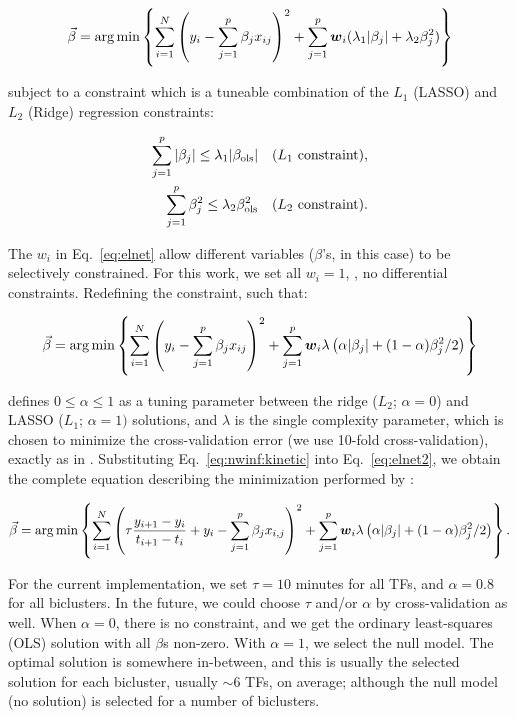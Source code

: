\begin{equation}
\label{eq:elnet}
 \vec{\beta} = \arg \min \left\{ \sum^N_{i = 1} \left( y_i - \sum^p_{j = 1} \beta_j x_{ij} \right)^2 + \sum_{j = 1}^p
   \boldsymbol{w}_i ( \lambda_1 | \beta_j | + \lambda_2 \beta^2_j) \right\}
\end{equation}

\noindent subject to a constraint which is a tuneable combination of the $L_1$
(LASSO) and $L_2$ (Ridge) regression constraints:

\vspace{-0.4in}

\begin{eqnarray*}
\label{eq:elnet:constraint}
\sum_{j = 1}^p | \beta_j | \leq \lambda_1 | \beta_{\operatorname{ols}} | & & \mathrm{(}L_1\ \mathrm{constraint)}, \\
\sum_{j = 1}^p \beta^2_j \leq \lambda_2 \beta^2_{\operatorname{ols}}     & & \mathrm{(}L_2\ \mathrm{constraint)}.
\end{eqnarray*}

\noindent 
The $w_i$ in Eq.~\ref{eq:elnet} allow different variables ($\beta$'s,
in this case) to be selectively constrained. For this work, we set all
$w_i=1$, \ie, no differential constraints. Redefining the constraint, such that:

\begin{equation}
\label{eq:elnet2}
 \vec{\beta} = \arg \min \left\{ \sum^N_{i = 1} \left( y_i - \sum^p_{j = 1} \beta_j x_{ij} \right)^2 + \sum_{j = 1}^p
   \boldsymbol{w}_i \lambda \left( \alpha | \beta_j | + (1-\alpha) \beta^2_j /2\right) \right\}
\end{equation}

\noindent defines $0\leq \alpha \leq 1$ as a tuning parameter between the ridge
($L_2$; $\alpha=0$) and LASSO ($L_1$; $\alpha=1)$ solutions, and
$\lambda$ is the single complexity parameter, which is chosen to
minimize the cross-validation error (we use 10-fold cross-validation),
exactly as in \cite{Bonneau2006}. Substituting
Eq.~\ref{eq:nwinf:kinetic} into Eq.~\ref{eq:elnet2}, we obtain the complete
equation describing the minimization performed by \nwinf:

\begin{equation}
\label{eq:elnet3}
 \vec{\beta} = \arg \min \left\{ \sum^N_{i = 1} 
 \left( \tau\frac{y_{i+1}-y_{i}}{t_{i+1}-t_i} + y_{i}- \sum_{j=1}^{p} \beta_j x_{i,j} \right)^2 + \sum_{j = 1}^p
   \boldsymbol{w}_i \lambda \left( \alpha | \beta_j | + (1-\alpha) \beta^2_j /2\right) \right\}.
\end{equation}

\noindent For the current implementation, we set
$\tau=10$ minutes for all TFs, and $\alpha=0.8$ for all biclusters. In
the future, we could choose $\tau$ and/or $\alpha$ by
cross-validation as well. When $\alpha=0$, there is no constraint, and
we get the ordinary least-squares (OLS) solution with all $\beta$s
non-zero. With $\alpha=1$, we select the null model. The optimal
solution is somewhere in-between, and this is usually the selected
solution for each bicluster, usually $\sim 6$ TFs, on average;
although the null model (no solution) is selected for a number of
biclusters.
